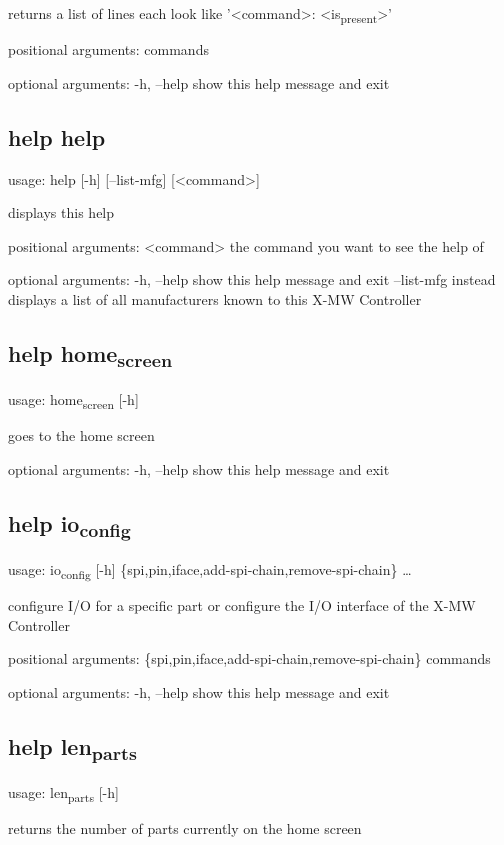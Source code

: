 \documentclass[11pt]{article}
\begin{document}
returns a list of lines each look like '<command>: <is\textsubscript{present}>'

positional arguments:
  commands

optional arguments:
  -h, --help  show this help message and exit

\subsection{help help}
\label{sec:org29a2ddc}
usage: help [-h] [--list-mfg] [<command>]

displays this help

positional arguments:
  <command>   the command you want to see the help of

optional arguments:
  -h, --help  show this help message and exit
  --list-mfg  instead displays a list of all manufacturers known to this X-MW
              Controller

\subsection{help home\textsubscript{screen}}
\label{sec:org1aefb80}
usage: home\textsubscript{screen} [-h]

goes to the home screen

optional arguments:
  -h, --help  show this help message and exit

\subsection{help io\textsubscript{config}}
\label{sec:orgc3517c2}
usage: io\textsubscript{config} [-h] \{spi,pin,iface,add-spi-chain,remove-spi-chain\} \ldots{}

configure I/O for a specific part or configure the I/O interface of the X-MW
Controller

positional arguments:
  \{spi,pin,iface,add-spi-chain,remove-spi-chain\}
                        commands

optional arguments:
  -h, --help            show this help message and exit

\subsection{help len\textsubscript{parts}}
\label{sec:org7d84586}
usage: len\textsubscript{parts} [-h]

returns the number of parts currently on the home screen
\end{document}
